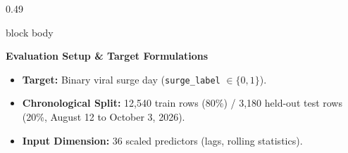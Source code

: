 \documentclass[aspectratio=169, 10pt]{beamer}
\newenvironment{card}[1][]{%
        \begin{beamercolorbox}[rounded=true,shadow=false,wd=\linewidth,sep=3.5pt,#1]{block body}%
        \fontsize{7.8pt}{9.8pt}\selectfont%
    }{%
        \end{beamercolorbox}%
    }
\begin{document}
\begin{frame}[t]
\begin{columns}[T]
\begin{column}{0.49\textwidth}
\begin{card}
                    {\fontsize{7.5pt}{9pt}\selectfont \textbf{\color{NavyPrimary}Evaluation Setup \& Target Formulations}}\\[0.04cm]                                                                   
                    \begin{itemize}\setlength{\itemsep}{1.5pt}                                                                                                                                         
                        \item \textbf{Target:} Binary viral surge day (\texttt{surge\_label} $\in \{0, 1\}$).                                                                                          
                        \item \textbf{Chronological Split:} 12,540 train rows (80\%) / 3,180 held-out test rows (20\%, August 12 to October 3, 2026).                                                  
                        \item \textbf{Input Dimension:} 36 scaled predictors (lags, rolling statistics).                                                                                               
                    \end{itemize}                                                                                                                                                                      
                \end{card}                                                                                                                                                                             
            \end{column}                                                                                                                                                                               
                                                                                                                                                                                                       

\end{columns}
\end{frame}
\end{document}
